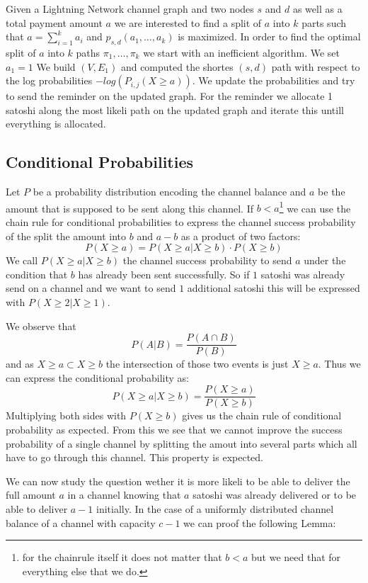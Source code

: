\documentclass[10pt,twocolumn]{article}
\begin{document}
Given a Lightning Network channel graph and two nodes $s$ and $d$ as well as a total payment amount $a$ we are interested to find a split of $a$ into $k$ parts such that $a=\sum_{i=1}^ka_i$ and $p_{s,d}(a_1,\dots,a_k)$ is maximized.
In order to find the optimal split of $a$ into $k$ paths $\pi_1,\dots,\pi_k$ we start with an inefficient algorithm.
We set $a_1 = 1$
We build $(V,E_1)$ and computed the shortes $(s,d)$ path with respect to the log probabilities $-log(P_{i,j}(X \geq a))$.
We update the probabilities and try to send the reminder on the updated graph.
For the reminder we allocate 1 satoshi along the most likeli path on the updated graph and iterate this untill everything is allocated.

\subsection{Conditional Probabilities}
Let $P$ be a probability distribution encoding the channel balance and $a$ be the amount that is supposed to be sent along this channel.
If $b<a$\footnote{for the chainrule itself it does not matter that $b<a$ but we need that for everything else that we do.} we can use the chain rule for conditional probabilities to express the channel success probability of the split the amount into $b$ and $a-b$ as a product of two factors:
\[
P(X \geq a) = P(X \geq a | X \geq b)\cdot P(X \geq b)
\]
We call $P(X\geq a | X \geq b)$ the channel success probability to send $a$ under the condition that $b$ has already been sent successfully.
So if $1$ satoshi was already send on a channel and we want to send $1$ additional satoshi this will be expressed with $P(X\geq 2 | X \geq 1)$.

We observe that
\[
P(A|B)=\frac{P(A\cap B)}{P(B)}
\]
and as $X \geq a \subset X \geq b$ the intersection of those two events is just $X\geq a$.
Thus we can express the conditional probability as:
\[
P(X\geq a| X\geq b) = \frac{P(X \geq a)}{P(X\geq b)}
\]
Multiplying both sides with $P(X\geq b)$ gives us the chain rule of conditional probability as expected.
From this we see that we cannot improve the success probability of a single channel by splitting the amout into several parts which all have to go through this channel.
This property is expected.

We can now study the question wether it is more likeli to be able to deliver the full amount $a$ in a channel knowing that $a$ satoshi was already delivered or to be able to deliver $a-1$ initially.
In the case of a uniformly distributed channel balance of a channel with capacity $c-1$ we can proof the following Lemma:
\end{document}
